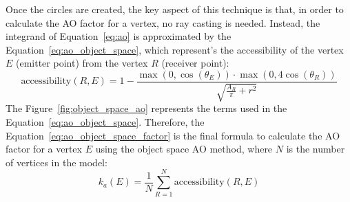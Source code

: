 Once the circles are created, the key aspect of this technique is that, in order to calculate the AO factor for a vertex, no ray casting is needed. Instead, the integrand of Equation~\eqref{eq:ao} is approximated by the Equation~\eqref{eq:ao_object_space}, which represent's the accessibility of the vertex $E$ (emitter point) from the vertex $R$ (receiver point):
\begin{equation}\label{eq:ao_object_space}
    \text{accessibility}(R, E) = 1- \frac{\max(0, \cos(\theta_E)) \cdot \max(0, 4\cos(\theta_R))}{\sqrt{\frac{A_R}{\pi}+r^2}}
\end{equation}
The Figure~\ref{fig:object_space_ao} represents the terms used in the Equation~\eqref{eq:ao_object_space}. Therefore, the Equation~\eqref{eq:ao_object_space_factor} is the final formula to calculate the AO factor for a vertex $E$ using the object space AO method, where $N$ is the number of vertices in the model:
\begin{equation}\label{eq:ao_object_space_factor}
    k_a(E) = \frac{1}{N} \sum_{R=1}^{N} \text{accessibility}(R, E)
\end{equation}

